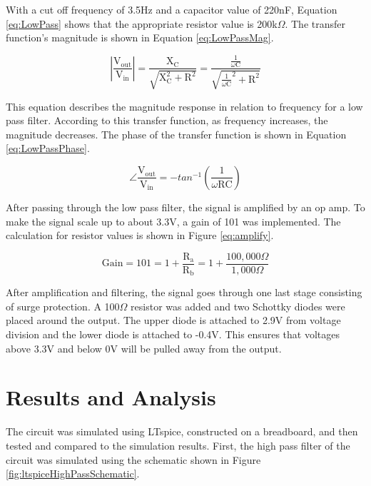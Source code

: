 \documentclass[CMPE]{KGCOEReport}
\begin{document}
With a cut off frequency of 3.5Hz and a capacitor value of 220nF, Equation \ref{eq:LowPass} shows that the appropriate resistor value is 200k$\Omega$. The transfer function's magnitude is shown in Equation \ref{eq:LowPassMag}.

\begin{equation}
|\frac{\text{V}_\text{out}}{\text{V}_\text{in}}| = \frac{\text{X}_\text{C}}{\sqrt{\text{X}_\text{C}^2 + \text{R}^2}} = \frac{\frac{1}{\omega\text{C}}}{\sqrt{\frac{1}{\omega\text{C}}^2 + \text{R}^2}} \label{eq:LowPassMag}
\end{equation}

This equation describes the magnitude response in relation to frequency for a low pass filter. According to this transfer function, as frequency increases, the magnitude decreases. The phase of the transfer function is shown in Equation \ref{eq:LowPassPhase}. 

\begin{equation}
\angle\frac{\text{V}_\text{out}}{\text{V}_\text{in}} = -tan^{-1}(\frac{1}{\omega\text{R}\text{C}}) \label{eq:LowPassPhase}
\end{equation}

After passing through the low pass filter, the signal is amplified by an op amp. To make the signal scale up to about 3.3V, a gain of 101 was implemented. The calculation for resistor values is shown in Figure \ref{eq:amplify}. 

\begin{equation}
\text{Gain} = 101 = 1 + \frac{\text{R}_\text{a}}{\text{R}_\text{b}} = 1 + \frac{100,000\Omega}{1,000\Omega} \label{eq:amplify}
\end{equation}

After amplification and filtering, the signal goes through one last stage consisting of surge protection. A 100$\Omega$ resistor was added and two Schottky diodes were placed around the output. The upper diode is attached to 2.9V from voltage division and the lower diode is attached to -0.4V. This ensures that voltages above 3.3V and below 0V will be pulled away from the output.

\section*{Results and Analysis}

The circuit was simulated using LTspice, constructed on a breadboard, and then tested and compared to the simulation results. First, the high pass filter of the circuit was simulated using the schematic shown in Figure \ref{fig:ltspiceHighPassSchematic}.
\end{document}
